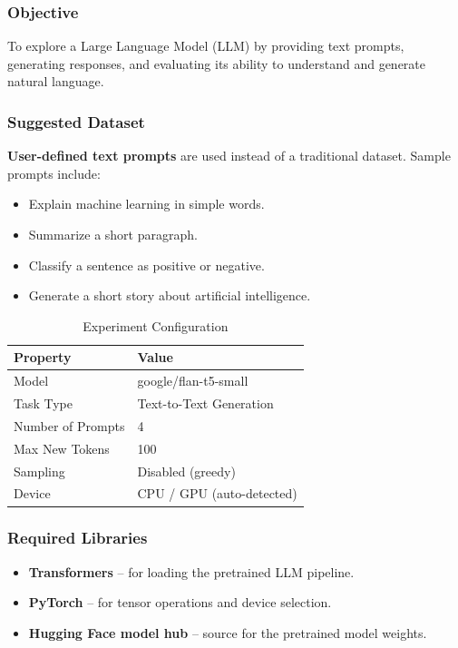 \documentclass[a4paper,11pt]{article}
\begin{document}
\begin{itemize}
\subsubsection{Objective}
To explore a Large Language Model (LLM) by providing text prompts, generating responses, and evaluating its ability to understand and generate natural language.

\subsubsection{Suggested Dataset}
\textbf{User-defined text prompts} are used instead of a traditional dataset. Sample prompts include:
\begin{itemize}
    \item Explain machine learning in simple words.
    \item Summarize a short paragraph.
    \item Classify a sentence as positive or negative.
    \item Generate a short story about artificial intelligence.
\end{itemize}

\begin{table}[H]
\centering
\caption{Experiment Configuration}
\begin{tabular}{ll}
\toprule
\textbf{Property} & \textbf{Value} \\
\midrule
Model                & google/flan-t5-small \\
Task Type            & Text-to-Text Generation \\
Number of Prompts    & 4 \\
Max New Tokens       & 100 \\
Sampling             & Disabled (greedy) \\
Device               & CPU / GPU (auto-detected) \\
\bottomrule
\end{tabular}
\end{table}

\subsubsection{Required Libraries}
\begin{itemize}
    \item \textbf{Transformers} -- for loading the pretrained LLM pipeline.
    \item \textbf{PyTorch} -- for tensor operations and device selection.
    \item \textbf{Hugging Face model hub} -- source for the pretrained model weights.
\end{itemize}


\end{itemize}
\end{document}

